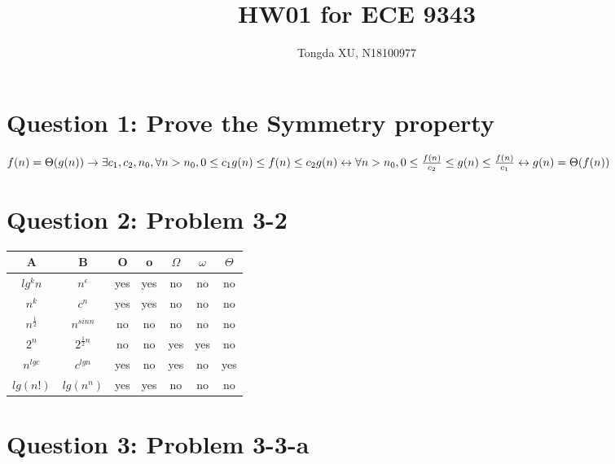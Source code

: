 \documentclass[]{article}
\title{HW01 for ECE 9343}
\author{Tongda XU, N18100977}
\begin{document}
\maketitle

\section{Question 1: Prove the Symmetry property}

$f(n) = \Theta(g(n)) \rightarrow \exists c_{1}, c_{2}, n_{0}, \forall n > n_{0}, 0 \le c_{1}g(n) \le f(n) \le c_{2}g(n)\\
\leftrightarrow \forall n > n_{0}, 0 \le \frac{f(n)}{c_{2}} \le g(n) \le \frac{f(n)}{c_{1}}\\
\leftrightarrow g(n) = \Theta(f(n))$

\section{Question 2: Problem 3-2}

\begin{tabular}{c c c c c c c}

	A & B & O & o & $\Omega$ & $\omega$ & $\Theta$ \\ 
	\hline 
	$lg^kn$ & $n^\epsilon$ & yes & yes & no & no & no \\ 
	\hline 
	$n^k$ & $c^n$ & yes & yes & no & no & no \\ 
	\hline 
	$n^{\frac{1}{2}}$ & $n^{sinn}$ & no & no & no & no & no \\ 
	\hline 
	$2^{n}$ & $2^{\frac{1}{2}n}$ & no & no & yes & yes & no \\ 
	\hline 
	$n^{lgc}$ & $c^{lgn}$ & yes & no & yes & no & yes \\ 
	\hline 
	$lg(n!)$ & $lg(n^n)$ & yes & yes & no & no & no \\ 
	
\end{tabular} 

\section{Question 3: Problem 3-3-a}
\end{document}

